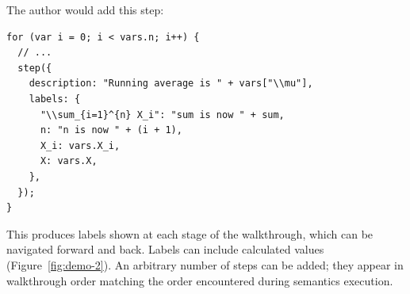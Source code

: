 The author would add this step:

\begin{tcolorbox}[codebox]
\begin{lstlisting}[style=jsstyle]
for (var i = 0; i < vars.n; i++) {
  // ...
  step({
    description: "Running average is " + vars["\\mu"],
    labels: {
      "\\sum_{i=1}^{n} X_i": "sum is now " + sum,
      n: "n is now " + (i + 1),
      X_i: vars.X_i,
      X: vars.X,
    },
  });
}
\end{lstlisting}
\end{tcolorbox}

This produces labels shown at each stage of the walkthrough, which can be navigated forward and back. Labels can include calculated values (Figure~\ref{fig:demo-2}). An arbitrary number of steps can be added; they appear in walkthrough order matching the order encountered during semantics execution.